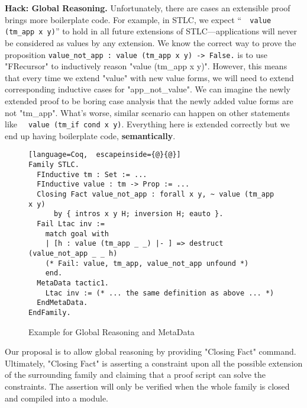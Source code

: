 
\textbf{Hack: Global Reasoning.}
Unfortunately, there are cases an extensible proof brings more boilerplate code. For example, in STLC, we expect
``\texttt{~ value (tm_app x y)}'' to hold in all future
extensions of STLC---applications will never be considered as values
by any extension.
We know the correct way to prove the proposition
\texttt{value_not_app : value (tm_app x y) -> False.} is to use
"FRecursor" to inductively reason "value (tm_app x y)". However, this
means that every time we extend "value" with new value forms, we will
need to extend corresponding inductive cases for "app_not_value". We can
imagine the newly extended proof to be boring case analysis that the
newly added value forms are not "tm_app". What's worse, similar
scenario can happen on other statements like \texttt{~ value
(tm_if cond x y)}. Everything here is extended correctly but we end up
having boilerplate code, \textbf{semantically}.
\begin{figure}[!htb]
\begin{lstlisting}[language=Coq,  escapeinside={@}{@}]
Family STLC.
  FInductive tm : Set := ... 
  FInductive value : tm -> Prop := ... 
  Closing Fact value_not_app : forall x y, ~ value (tm_app x y) 
      by { intros x y H; inversion H; eauto }.
  Fail Ltac inv := 
    match goal with 
    | [h : value (tm_app _ _) |- ] => destruct (value_not_app _ _ h)
    (* Fail: value, tm_app, value_not_app unfound *)
    end. 
  MetaData tactic1.
    Ltac inv := (* ... the same definition as above ... *)
  EndMetaData.
EndFamily.
\end{lstlisting}  
\caption{Example for Global Reasoning and MetaData}\label{fig:plugin-example-global-reasoning-meta-data}
\end{figure}


Our proposal is to allow global reasoning by providing "Closing Fact" command. Ultimately, "Closing Fact" is asserting a constraint upon all the
possible extension of the surrounding family and claiming that a proof script
can solve the constraints.
The assertion will only be verified when the whole family is closed and compiled into a module.

